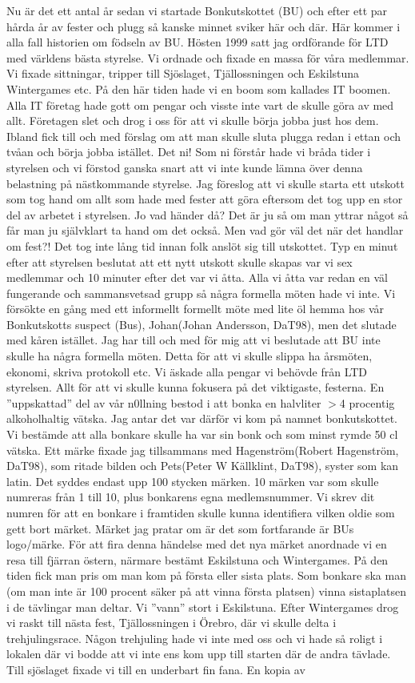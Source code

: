 Nu är det ett antal år sedan vi startade Bonkutskottet (BU) och efter ett par hårda år av fester och plugg så kanske minnet sviker här och där. Här kommer i alla fall historien om födseln av BU. Hösten 1999 satt jag ordförande för LTD med världens bästa styrelse. Vi ordnade och fixade en massa för våra medlemmar. Vi fixade sittningar, tripper till Sjöslaget, Tjällossningen och Eskilstuna Wintergames etc. På den här tiden hade vi en boom som kallades IT boomen. Alla IT företag hade gott om pengar och visste inte vart de skulle göra av med allt. Företagen slet och drog i oss för att vi skulle börja jobba just hos dem. Ibland fick till och med förslag om att man skulle sluta plugga redan i ettan och tvåan och börja jobba istället. Det ni! Som ni förstår hade vi bråda tider i styrelsen och vi förstod ganska snart att vi inte kunde lämna över denna belastning på nästkommande styrelse. Jag föreslog att vi skulle starta ett utskott som tog hand om allt som hade med fester att göra eftersom det tog upp en stor del av arbetet i styrelsen. Jo vad händer då? Det är ju så om man yttrar något så får man ju självklart ta hand om det också. Men vad gör väl det när det handlar om fest?! Det tog inte lång tid innan folk anslöt sig till utskottet. Typ en minut efter att styrelsen beslutat att ett nytt utskott skulle skapas var vi sex medlemmar och 10 minuter efter det var vi åtta. Alla vi åtta var redan en väl fungerande och sammansvetsad grupp så några formella möten hade vi inte. Vi försökte en gång med ett informellt formellt möte med lite öl hemma hos vår Bonkutskotts suspect (Bus), Johan(Johan Andersson, DaT98), men det slutade med kåren istället. Jag har till och med för mig att vi beslutade att BU inte skulle ha några formella möten. Detta för att vi skulle slippa ha årsmöten, ekonomi, skriva protokoll etc. Vi äskade alla pengar vi behövde från LTD styrelsen. Allt för att vi skulle kunna fokusera på det viktigaste, festerna. En ”uppskattad” del av vår n0llning bestod i att bonka en halvliter \(>\)4 procentig alkoholhaltig vätska. Jag antar det var därför vi kom på namnet bonkutskottet. Vi bestämde att alla bonkare skulle ha var sin bonk och som minst rymde 50 cl vätska. Ett märke fixade jag tillsammans med Hagenström(Robert Hagenström, DaT98), som ritade bilden och Pets(Peter W Källklint, DaT98), syster som kan latin. Det syddes endast upp 100 stycken märken. 10 märken var som skulle numreras från 1 till 10, plus bonkarens egna medlemsnummer. Vi skrev dit numren för att en bonkare i framtiden skulle kunna identifiera vilken oldie som gett bort märket. Märket jag pratar om är det som fortfarande är BUs logo/märke. För att fira denna händelse med det nya märket anordnade vi en resa till fjärran östern, närmare bestämt Eskilstuna och Wintergames. På den tiden fick man pris om man kom på första eller sista plats. Som bonkare ska man (om man inte är 100 procent säker på att vinna första platsen) vinna sistaplatsen i de tävlingar man deltar. Vi ”vann” stort i Eskilstuna. Efter Wintergames drog vi raskt till nästa fest, Tjällossningen i Örebro, där vi skulle delta i trehjulingsrace. Någon trehjuling hade vi inte med oss och vi hade så roligt i lokalen där vi bodde att vi inte ens kom upp till starten där de andra tävlade. Till sjöslaget fixade vi till en underbart fin fana. En kopia av 